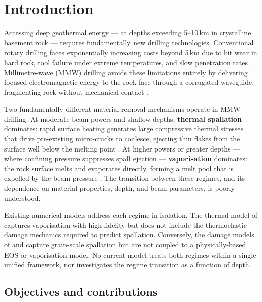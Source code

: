 \documentclass[12pt, a4paper]{article}
\begin{document}
\tableofcontents
\newpage

\section{Introduction}
\label{sec:intro}

Accessing deep geothermal energy — at depths exceeding 5--10\,km in crystalline
basement rock — requires fundamentally new drilling technologies.  Conventional
rotary drilling faces exponentially increasing costs beyond 5\,km due to bit wear
in hard rock, tool failure under extreme temperatures, and slow penetration rates
\citep{tester2006future, augustine2009hydrothermal}.  Millimetre-wave (MMW) drilling
avoids these limitations entirely by delivering focused electromagnetic energy to
the rock face through a corrugated waveguide, fragmenting rock without mechanical
contact \citep{oglesby2014mmw, houde2021mmw, zhang2023thermal}.

Two fundamentally different material removal mechanisms operate in MMW drilling.
At moderate beam powers and shallow depths, \textbf{thermal spallation} dominates:
rapid surface heating generates large compressive thermal stresses that drive
pre-existing micro-cracks to coalesce, ejecting thin flakes from the surface well
below the melting point \citep{rauenzahn1989rock, kant2017theory}.  At higher
powers or greater depths — where confining pressure suppresses spall ejection —
\textbf{vaporisation} dominates: the rock surface melts and evaporates directly,
forming a melt pool that is expelled by the beam pressure \citep{zhang2023thermal}.
The transition between these regimes, and its dependence on material properties,
depth, and beam parameters, is poorly understood.

Existing numerical models address each regime in isolation.  The thermal model of
\citet{zhang2023thermal} captures vaporisation with high fidelity but does not
include the thermoelastic damage mechanics required to predict spallation.
Conversely, the damage models of \citet{vogler2020simulation} and
\citet{liu2023failure} capture grain-scale spallation but are not coupled to a
physically-based EOS or vaporisation model.  No current model treats both regimes
within a single unified framework, nor investigates the regime transition as a
function of depth.

\subsection*{Objectives and contributions}
\end{document}

